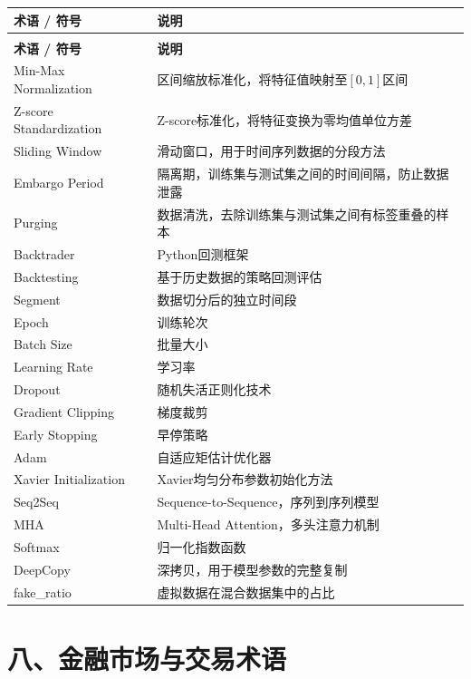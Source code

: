\begin{longtable}{>{\raggedright\arraybackslash}p{4.5cm} p{9.5cm}}
\toprule
\textbf{术语 / 符号} & \textbf{说明} \\
\midrule
\endfirsthead
\multicolumn{2}{c}{\tablename\ -- 续表} \\
\toprule
\textbf{术语 / 符号} & \textbf{说明} \\
\midrule
\endhead
\bottomrule
\endlastfoot

Min-Max Normalization & 区间缩放标准化，将特征值映射至$[0,1]$区间 \\
Z-score Standardization & Z-score标准化，将特征变换为零均值单位方差 \\
Sliding Window & 滑动窗口，用于时间序列数据的分段方法 \\
Embargo Period & 隔离期，训练集与测试集之间的时间间隔，防止数据泄露 \\
Purging & 数据清洗，去除训练集与测试集之间有标签重叠的样本 \\
Backtrader & Python回测框架 \\
Backtesting & 基于历史数据的策略回测评估 \\
Segment & 数据切分后的独立时间段 \\
Epoch & 训练轮次 \\
Batch Size & 批量大小 \\
Learning Rate & 学习率 \\
Dropout & 随机失活正则化技术 \\
Gradient Clipping & 梯度裁剪 \\
Early Stopping & 早停策略 \\
Adam & 自适应矩估计优化器 \\
Xavier Initialization & Xavier均匀分布参数初始化方法 \\
Seq2Seq & Sequence-to-Sequence，序列到序列模型 \\
MHA & Multi-Head Attention，多头注意力机制 \\
Softmax & 归一化指数函数 \\
DeepCopy & 深拷贝，用于模型参数的完整复制 \\
fake\_ratio & 虚拟数据在混合数据集中的占比 \\
\end{longtable}

\section*{八、金融市场与交易术语}


